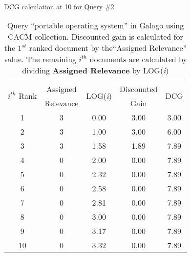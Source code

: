 \begin{table}[!htbp]
	\caption{DCG calculation at 10 for Query \#2} \label{tab:dcg2-at10-cal}
	\begin{center}
	\vspace{-5mm}
		\begin{tabular}{ c | c | c | c | c}
			\toprule
			\multirow{2}{*}{\textit{$i^{th}$} Rank} & Assigned & \multirow{2}{*}{LOG(\textit{i})} & Discounted & \multirow{2}{*}{DCG}\\
			& Relevance & & Gain & \\
			\midrule
			1 & 3 & 0.00 & 3.00 & 3.00 \\
			2 & 3 & 1.00 & 3.00 & 6.00 \\
			3 & 3 & 1.58 & 1.89 & 7.89 \\
			4 & 0 & 2.00 & 0.00 & 7.89 \\
			5 & 0 & 2.32 & 0.00 & 7.89 \\
			6 & 0 & 2.58 & 0.00 & 7.89 \\
			7 & 0 & 2.81 & 0.00 & 7.89 \\
			8 & 0 & 3.00 & 0.00 & 7.89 \\
			9 & 0 & 3.17 & 0.00 & 7.89 \\
			10 & 0 & 3.32 & 0.00 & 7.89 \\
			\bottomrule
		\end{tabular}
	\caption*{\scriptsize Query ``portable operating system'' in Galago using CACM collection. Discounted gain is calculated for the $1^{st}$ ranked document by the``Assigned Relevance'' value. The remaining $i^{th}$ documents are calculated by dividing \textbf{Assigned Relevance} by LOG(\textit{i}) }
	 \end{center}
\end{table}
